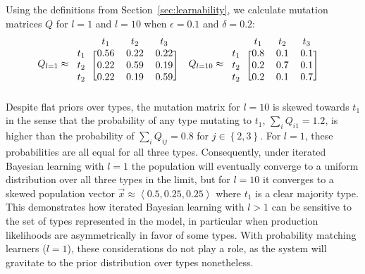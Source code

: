 \documentclass[a4paper, 11pt]{article}
\theoremstyle{Satz}
\newcommand{\tuple}[1]{\ensuremath{\left\langle #1 \right\rangle}}
\newcommand{\set}[1]{\left\{#1\right\}}
\begin{document}
Using the definitions from Section~\ref{sec:learnability}, we calculate mutation matrices $Q$ for
$l=1$ and $l=10$ when $\epsilon = 0.1$ and $\delta = 0.2$:
\begin{align*}
  Q_{l = 1} & \approx \begin{blockarray}{lccc}
    & t_1 & t_2 & t_3 \\
    \begin{block}{l[ccc]}
      t_1 & 0.56 & 0.22 & 0.22 \\
      t_2 & 0.22 & 0.59 & 0.19 \\
      t_2 & 0.22 & 0.19 & 0.59  \\
    \end{block}
  \end{blockarray} & 
  Q_{l = 10} & \approx \begin{blockarray}{lccc}
    & t_1 & t_2 & t_3 \\
    \begin{block}{l[ccc]}
      t_1 & 0.8 & 0.1 & 0.1 \\
      t_2 & 0.2 & 0.7 & 0.1 \\
      t_2 & 0.2 & 0.1 & 0.7  \\
    \end{block}
  \end{blockarray}
\end{align*}
Despite flat priors over types, the mutation matrix for $l=10$ is skewed towards $t_1$ in the
sense that the probability of any type mutating to $t_1$, $\sum_i Q_{i1} = 1.2$, is higher than
the probability of $\sum_i Q_{ij} = 0.8$ for $j \in \set{2,3}$. For $l=1$, these probabilities
are all equal for all three types. Consequently, under iterated Bayesian learning with $l=1$
the population will eventually converge to a uniform distribution over all three types in the limit, but
for $l=10$ it converges to a skewed population vector $\vec{x} \approx \tuple{0.5, 0.25, 0.25}$
where $t_1$ is a clear majority type. This demonstrates how iterated Bayesian learning with
$l>1$ can be sensitive to the set of types represented in the model, in particular when
production likelihoods are asymmetrically in favor of some types. With probability matching
learners ($l = 1$), these considerations do not play a role, as the system will gravitate to
the prior distribution over types nonetheless.



\end{document}
